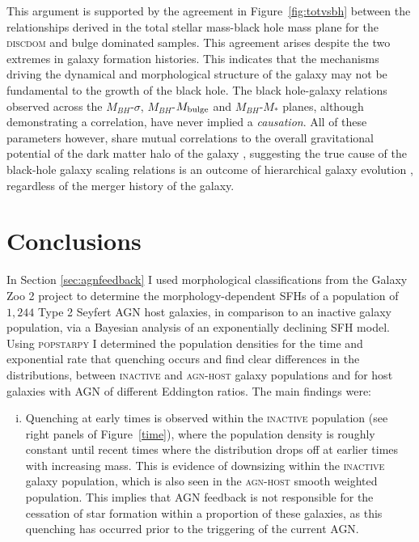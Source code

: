 {This argument is supported by the agreement in Figure~\ref{fig:totvsbh} between the relationships derived in the total stellar mass-black hole mass plane for the \textsc{discdom} and bulge dominated \citet{haringrix04} samples. This agreement arises despite the two extremes in galaxy formation histories. This indicates that the mechanisms driving the dynamical and morphological structure of the galaxy may not be fundamental to the growth of the black hole. The black hole-galaxy relations observed across the $M_{BH}$-$\sigma$, $M_{BH}$-$M_{\rm{bulge}}$ and $M_{BH}$-$M_{*}$ planes, although demonstrating a correlation, have never implied a \emph{causation}. All of these parameters however, share mutual correlations to the overall gravitational potential of the dark matter halo of the galaxy \citep{booth10, volonteri11}, suggesting the true cause of the black-hole galaxy scaling relations is an outcome of hierarchical galaxy evolution \citep{jahnke11}, regardless of the merger history of the galaxy. 
 

\section{Conclusions}\label{sec:agnconclusion}

In Section \ref{sec:agnfeedback} I used morphological classifications from the Galaxy Zoo 2 project to determine the morphology-dependent SFHs of a population of $1,244$ Type 2 Seyfert AGN host galaxies, in comparison to an inactive galaxy population, via a Bayesian analysis of an exponentially declining SFH model. Using \textsc{popstarpy} I determined the population densities for the time and exponential rate that quenching occurs and find clear differences in the distributions, between \textsc{inactive} and \textsc{agn-host} galaxy populations and for host galaxies with AGN of different Eddington ratios. The main findings were:

\begin{enumerate}[(i)]
\item Quenching at early times is observed within the \textsc{inactive} population (see right panels of Figure~\ref{time}), where the population density is roughly constant until recent times where the distribution drops off at earlier times with increasing mass. This is evidence of downsizing within the \textsc{inactive} galaxy population, which is also seen in the \textsc{agn-host} smooth weighted population. This implies that AGN feedback is not responsible for the cessation of star formation within a proportion of these galaxies, as this quenching has occurred prior to the triggering of the current AGN.


\end{enumerate}}

